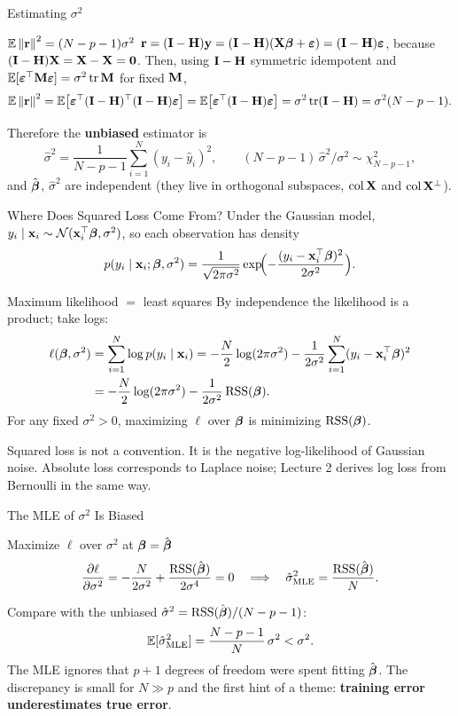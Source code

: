 \documentclass[11pt,aspectratio=169]{beamer}
\begin{document}
\begin{frame}{Estimating $\sigma^2$}
\begin{derivation}{$\mathbb{E}\left\lVert \mathbf{r} \right\rVert^2=(N-p-1)\sigma^2$}
$\mathbf{r}=(\mathbf{I}-\mathbf{H})\mathbf{y}=(\mathbf{I}-\mathbf{H})(\mathbf{X}\boldsymbol{\beta}+\boldsymbol{\varepsilon})=(\mathbf{I}-\mathbf{H})\boldsymbol{\varepsilon}$, because $(\mathbf{I}-\mathbf{H})\mathbf{X}=\mathbf{X}-\mathbf{X}=\mathbf{0}$.
Then, using $\mathbf{I}-\mathbf{H}$ symmetric idempotent and $\mathbb{E}[\boldsymbol{\varepsilon}^{\top}\mathbf{M}\boldsymbol{\varepsilon}]=\sigma^2\operatorname{tr}\mathbf{M}$ for fixed $\mathbf{M}$,
\[
\mathbb{E}\left\lVert \mathbf{r} \right\rVert^2=\mathbb{E}\bigl[\boldsymbol{\varepsilon}^{\top}(\mathbf{I}-\mathbf{H})^{\top}(\mathbf{I}-\mathbf{H})\boldsymbol{\varepsilon}\bigr]=\mathbb{E}\bigl[\boldsymbol{\varepsilon}^{\top}(\mathbf{I}-\mathbf{H})\boldsymbol{\varepsilon}\bigr]
=\sigma^2\operatorname{tr}(\mathbf{I}-\mathbf{H})=\sigma^2(N-p-1).
\]
\end{derivation}
Therefore the \textbf{unbiased} estimator is
\[
\hat\sigma^2=\frac{1}{N-p-1}\sum_{i=1}^N(y_i-\hat y_i)^2,\qquad
(N-p-1)\,\hat\sigma^2\big/\sigma^2\sim\chi^2_{N-p-1},
\]
and $\hat{\boldsymbol{\beta}}$, $\hat\sigma^2$ are independent (they live in orthogonal subspaces, $\operatorname{col}\mathbf{X}$ and $\operatorname{col}\mathbf{X}^\perp$).
\end{frame}

\begin{frame}{Where Does Squared Loss Come From?}\small
Under the Gaussian model, $y_i\mid\mathbf{x}_i\sim\mathcal{N}(\mathbf{x}_i^{\top}\boldsymbol{\beta},\sigma^2)$, so each observation has density
\[
p(y_i\mid\mathbf{x}_i;\boldsymbol{\beta},\sigma^2)=\frac{1}{\sqrt{2\pi\sigma^2}}\exp\!\Bigl(-\frac{(y_i-\mathbf{x}_i^{\top}\boldsymbol{\beta})^2}{2\sigma^2}\Bigr).
\]
\begin{derivation}{Maximum likelihood $=$ least squares}
By independence the likelihood is a product; take logs:
\begin{align*}
\ell(\boldsymbol{\beta},\sigma^2)&=\sum_{i=1}^N\log p(y_i\mid\mathbf{x}_i)
=-\frac N2\log(2\pi\sigma^2)-\frac{1}{2\sigma^2}\sum_{i=1}^N(y_i-\mathbf{x}_i^{\top}\boldsymbol{\beta})^2\\
&=-\frac N2\log(2\pi\sigma^2)-\frac{1}{2\sigma^2}\operatorname{RSS}(\boldsymbol{\beta}).
\end{align*}
For any fixed $\sigma^2>0$, maximizing $\ell$ over $\boldsymbol{\beta}$ is minimizing $\operatorname{RSS}(\boldsymbol{\beta})$.
\end{derivation}
\begin{keypoint}
Squared loss is not a convention. It is the negative log-likelihood of Gaussian noise. Absolute loss
corresponds to Laplace noise; Lecture 2 derives log loss from Bernoulli in the same way.
\end{keypoint}
\end{frame}

\begin{frame}{The MLE of $\sigma^2$ Is Biased}
\begin{derivation}{Maximize $\ell$ over $\sigma^2$ at $\boldsymbol{\beta}=\hat{\boldsymbol{\beta}}$}
\[
\frac{\partial\ell}{\partial\sigma^2}=-\frac{N}{2\sigma^2}+\frac{\operatorname{RSS}(\hat{\boldsymbol{\beta}})}{2\sigma^4}=0
\quad\Longrightarrow\quad
\hat\sigma^2_{\text{MLE}}=\frac{\operatorname{RSS}(\hat{\boldsymbol{\beta}})}{N}.
\]
\end{derivation}
Compare with the unbiased $\hat\sigma^2=\operatorname{RSS}(\hat{\boldsymbol{\beta}})/(N-p-1)$:
\[
\mathbb{E}[\hat\sigma^2_{\text{MLE}}]=\frac{N-p-1}{N}\,\sigma^2<\sigma^2 .
\]
The MLE ignores that $p+1$ degrees of freedom were spent fitting $\hat{\boldsymbol{\beta}}$. The discrepancy is
small for $N\gg p$ and the first hint of a theme: \textbf{training error underestimates true error}.
\end{frame}
\end{document}
